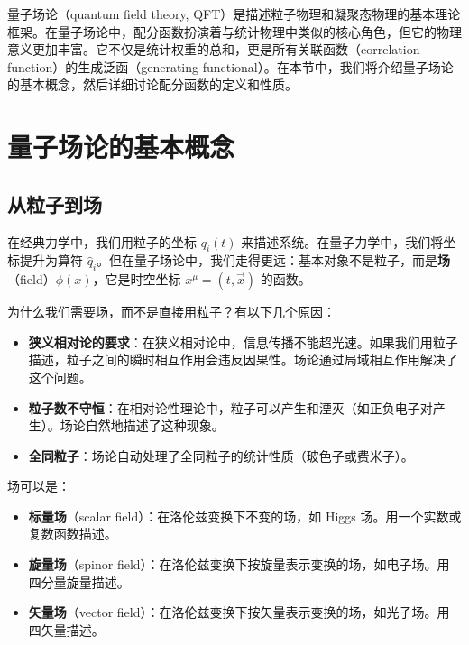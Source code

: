 
量子场论（quantum field theory, QFT）是描述粒子物理和凝聚态物理的基本理论框架。在量子场论中，配分函数扮演着与统计物理中类似的核心角色，但它的物理意义更加丰富。它不仅是统计权重的总和，更是所有关联函数（correlation function）的生成泛函（generating functional）。在本节中，我们将介绍量子场论的基本概念，然后详细讨论配分函数的定义和性质。

\section{量子场论的基本概念}

\subsection{从粒子到场}

在经典力学中，我们用粒子的坐标 $q_i(t)$ 来描述系统。在量子力学中，我们将坐标提升为算符 $\hat{q}_i$。但在量子场论中，我们走得更远：基本对象不是粒子，而是\textbf{场}（field）$\phi(x)$，它是时空坐标 $x^\mu = (t, \vec{x})$ 的函数。

\begin{note}[为什么要用场？]
为什么我们需要场，而不是直接用粒子？有以下几个原因：
\begin{itemize}
    \item \textbf{狭义相对论的要求}：在狭义相对论中，信息传播不能超光速。如果我们用粒子描述，粒子之间的瞬时相互作用会违反因果性。场论通过局域相互作用解决了这个问题。
    \item \textbf{粒子数不守恒}：在相对论性理论中，粒子可以产生和湮灭（如正负电子对产生）。场论自然地描述了这种现象。
    \item \textbf{全同粒子}：场论自动处理了全同粒子的统计性质（玻色子或费米子）。
\end{itemize}
\end{note}

场可以是：
\begin{itemize}
    \item \textbf{标量场}（scalar field）：在洛伦兹变换下不变的场，如 Higgs 场。用一个实数或复数函数描述。
    \item \textbf{旋量场}（spinor field）：在洛伦兹变换下按旋量表示变换的场，如电子场。用四分量旋量描述。
    \item \textbf{矢量场}（vector field）：在洛伦兹变换下按矢量表示变换的场，如光子场。用四矢量描述。
\end{itemize}

